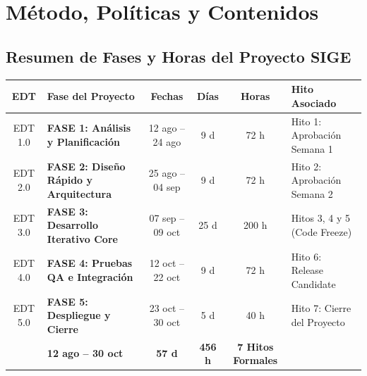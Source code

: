 \documentclass[12pt,a4paper]{article}
\begin{document}
\section{Método, Políticas y Contenidos}

\subsection{Resumen de Fases y Horas del Proyecto SIGE}
\begin{table}[h!]
\centering
\small
\renewcommand{\arraystretch}{1.15}
\begin{tabularx}{\textwidth}{|c|>{\bfseries}p{4.2cm}|c|c|c|X|}
\hline
\rowcolor{tableheader}
EDT & Fase del Proyecto & Fechas & Días & Horas & Hito Asociado \\
\hline
EDT 1.0 & FASE 1: Análisis y Planificación & 12 ago -- 24 ago & 9 d & 72 h & Hito 1: Aprobación Semana 1 \\
\hline
EDT 2.0 & FASE 2: Diseño Rápido y Arquitectura & 25 ago -- 04 sep & 9 d & 72 h & Hito 2: Aprobación Semana 2 \\
\hline
EDT 3.0 & FASE 3: Desarrollo Iterativo Core & 07 sep -- 09 oct & 25 d & 200 h & Hitos 3, 4 y 5 (Code Freeze) \\
\hline
EDT 4.0 & FASE 4: Pruebas QA e Integración & 12 oct -- 22 oct & 9 d & 72 h & Hito 6: Release Candidate \\
\hline
EDT 5.0 & FASE 5: Despliegue y Cierre & 23 oct -- 30 oct & 5 d & 40 h & Hito 7: Cierre del Proyecto \\
\hline
\rowcolor{lightgraybg}
\multicolumn{2}{|c|}{\textbf{TOTAL PROYECTO COMPLETO}} & \textbf{12 ago -- 30 oct} & \textbf{57 d} & \textbf{456 h} & \textbf{7 Hitos Formales} \\
\hline
\end{tabularx}
\end{table}
\end{document}
